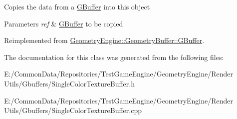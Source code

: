 Copies the data from a \mbox{\hyperlink{class_geometry_engine_1_1_geometry_buffer_1_1_g_buffer}{G\+Buffer}} into this object 
\begin{DoxyParams}{Parameters}
{\em ref} & \mbox{\hyperlink{class_geometry_engine_1_1_geometry_buffer_1_1_g_buffer}{G\+Buffer}} to be copied \\
\hline
\end{DoxyParams}


Reimplemented from \mbox{\hyperlink{class_geometry_engine_1_1_geometry_buffer_1_1_g_buffer_a9f20eb78703ef048d59a54f90ee09f25}{Geometry\+Engine\+::\+Geometry\+Buffer\+::\+G\+Buffer}}.



The documentation for this class was generated from the following files\+:\begin{DoxyCompactItemize}
\item 
E\+:/\+Common\+Data/\+Repositories/\+Test\+Game\+Engine/\+Geometry\+Engine/\+Render Utils/\+Gbuffers/Single\+Color\+Texture\+Buffer.\+h\item 
E\+:/\+Common\+Data/\+Repositories/\+Test\+Game\+Engine/\+Geometry\+Engine/\+Render Utils/\+Gbuffers/Single\+Color\+Texture\+Buffer.\+cpp\end{DoxyCompactItemize}
